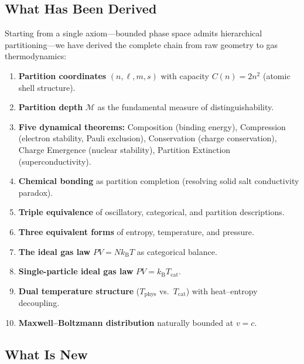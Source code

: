 \documentclass[twocolumn,10pt,a4paper]{article}
\theoremstyle{plain}
\theoremstyle{definition}
\theoremstyle{remark}
\newcommand{\kB}{k_{\mathrm{B}}}
\newcommand{\Depth}{\mathcal{M}}
\begin{document}
\subsection{What Has Been Derived}

Starting from a single axiom---bounded phase space admits hierarchical partitioning---we have derived the complete chain from raw geometry to gas thermodynamics:

\begin{enumerate}
    \item \textbf{Partition coordinates} $(n, \ell, m, s)$ with capacity $C(n) = 2n^2$ (atomic shell structure).
    \item \textbf{Partition depth} $\Depth$ as the fundamental measure of distinguishability.
    \item \textbf{Five dynamical theorems:} Composition (binding energy), Compression (electron stability, Pauli exclusion), Conservation (charge conservation), Charge Emergence (nuclear stability), Partition Extinction (superconductivity).
    \item \textbf{Chemical bonding} as partition completion (resolving solid salt conductivity paradox).
    \item \textbf{Triple equivalence} of oscillatory, categorical, and partition descriptions.
    \item \textbf{Three equivalent forms} of entropy, temperature, and pressure.
    \item \textbf{The ideal gas law} $PV = N\kB T$ as categorical balance.
    \item \textbf{Single-particle ideal gas law} $PV = \kB T_{\mathrm{cat}}$.
    \item \textbf{Dual temperature structure} ($T_{\mathrm{phys}}$ vs.\ $T_{\mathrm{cat}}$) with heat--entropy decoupling.
    \item \textbf{Maxwell--Boltzmann distribution} naturally bounded at $v = c$.
\end{enumerate}

\subsection{What Is New}
\end{document}
